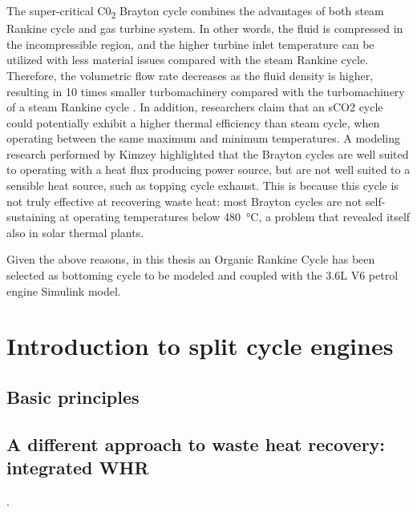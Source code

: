 The super-critical C0\textsubscript{2} Brayton cycle combines the advantages of both steam Rankine cycle and gas turbine system. In other words, the fluid is compressed in the incompressible region, and the higher turbine inlet temperature can be utilized with less material issues compared with the steam Rankine cycle. Therefore, the volumetric flow rate decreases as the fluid density is higher, resulting in 10 times smaller turbomachinery compared with the turbomachinery of a steam Rankine cycle \cite{Ahn2015}. In addition, researchers claim \cite{Kimzey2012} that an sCO2 cycle could potentially exhibit a higher thermal efficiency than steam cycle, when operating between the same maximum and minimum temperatures. A modeling research performed by Kimzey \cite{Kimzey2012} highlighted that the Brayton cycles are well suited to operating with a heat flux producing power source, but are not well suited to a sensible heat source, such as topping cycle exhaust. This is because this cycle is not truly effective at recovering waste heat: most Brayton cycles are not self-sustaining at operating temperatures below \SI{480}{\celsius}, a problem that revealed itself also in solar thermal plants. 

Given the above reasons, in this thesis an Organic Rankine Cycle has been selected as bottoming cycle to be modeled and coupled with the 3.6L V6 petrol engine Simulink model.

\section{Introduction to split cycle engines}

\subsection{Basic principles}

\subsection{A different approach to waste heat recovery: integrated WHR}.
